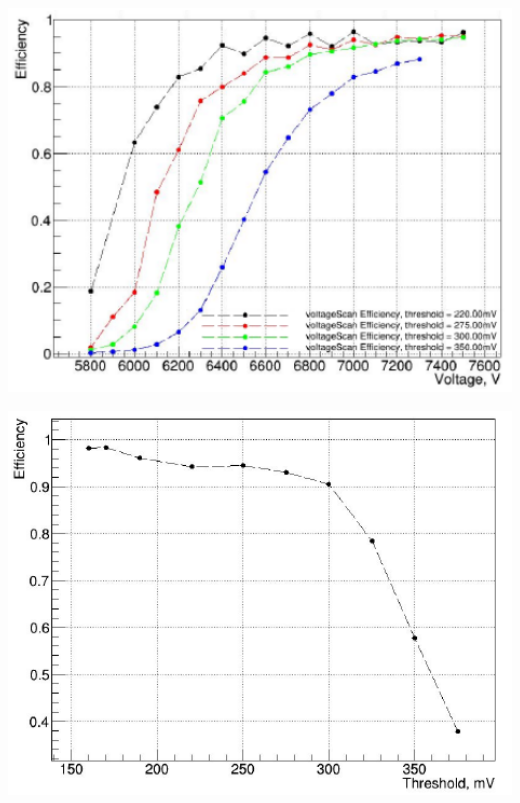 \noindent
\begin{minipage}[t]{.48\textwidth}
	\noindent
	\centering
	\includegraphics[width=1\textwidth]{GLA/HVH2.png}
	\captionsetup{type=figure}\caption{Efficacité de la chambre en verre de basse résistivité en fonction de la haute tension appliquée pour différents seuils (\SI{220}{\milli\volt} en noir, \SI{275}{\milli\volt} en rouge, \SI{300}{\milli\volt} en vert, \SI{350}{\milli\volt} en bleu). }
	\label{HVH2}
\end{minipage}%
\hfill
\begin{minipage}[t]{.48\textwidth}
	\noindent
	\centering
	\includegraphics[width=1\textwidth]{GLA/THH2.png}
	\captionsetup{type=figure}\caption{Efficacité de la chambre de basse résistivité en fonction du seuil appliqué. La tension appliquée est de \SI{7000}{\volt}.}
	\label{THH2}
\end{minipage}

